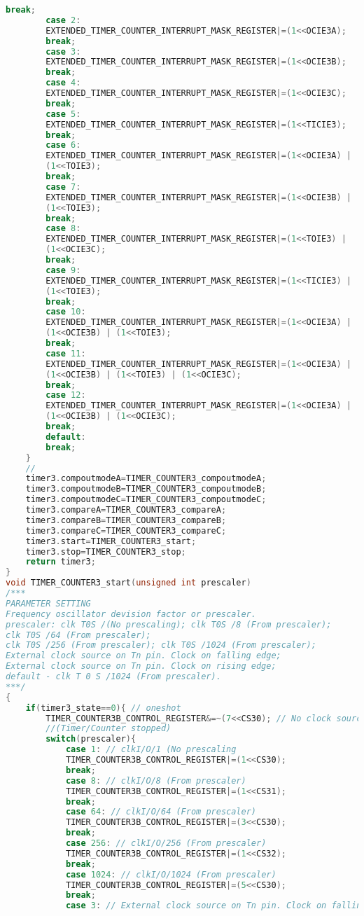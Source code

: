 \begin{lstlisting}[language=C, caption={atmega128timer.c}, label=atmega128timer-c, captionpos=b]
		break;
		case 2:
		EXTENDED_TIMER_COUNTER_INTERRUPT_MASK_REGISTER|=(1<<OCIE3A);
		break;
		case 3:
		EXTENDED_TIMER_COUNTER_INTERRUPT_MASK_REGISTER|=(1<<OCIE3B);
		break;
		case 4:
		EXTENDED_TIMER_COUNTER_INTERRUPT_MASK_REGISTER|=(1<<OCIE3C);
		break;
		case 5:
		EXTENDED_TIMER_COUNTER_INTERRUPT_MASK_REGISTER|=(1<<TICIE3);
		break;
		case 6:
		EXTENDED_TIMER_COUNTER_INTERRUPT_MASK_REGISTER|=(1<<OCIE3A) |
		(1<<TOIE3);
		break;
		case 7:
		EXTENDED_TIMER_COUNTER_INTERRUPT_MASK_REGISTER|=(1<<OCIE3B) |
		(1<<TOIE3);
		break;
		case 8:
		EXTENDED_TIMER_COUNTER_INTERRUPT_MASK_REGISTER|=(1<<TOIE3) |
		(1<<OCIE3C);
		break;
		case 9:
		EXTENDED_TIMER_COUNTER_INTERRUPT_MASK_REGISTER|=(1<<TICIE3) |
		(1<<TOIE3);
		break;
		case 10:
		EXTENDED_TIMER_COUNTER_INTERRUPT_MASK_REGISTER|=(1<<OCIE3A) |
		(1<<OCIE3B) | (1<<TOIE3);
		break;
		case 11:
		EXTENDED_TIMER_COUNTER_INTERRUPT_MASK_REGISTER|=(1<<OCIE3A) |
		(1<<OCIE3B) | (1<<TOIE3) | (1<<OCIE3C);
		break;
		case 12:
		EXTENDED_TIMER_COUNTER_INTERRUPT_MASK_REGISTER|=(1<<OCIE3A) |
		(1<<OCIE3B) | (1<<OCIE3C);
		break;
		default:
		break;
	}
	//
	timer3.compoutmodeA=TIMER_COUNTER3_compoutmodeA;
	timer3.compoutmodeB=TIMER_COUNTER3_compoutmodeB;
	timer3.compoutmodeC=TIMER_COUNTER3_compoutmodeC;
	timer3.compareA=TIMER_COUNTER3_compareA;
	timer3.compareB=TIMER_COUNTER3_compareB;
	timer3.compareC=TIMER_COUNTER3_compareC;
	timer3.start=TIMER_COUNTER3_start;
	timer3.stop=TIMER_COUNTER3_stop;
	return timer3;
}
void TIMER_COUNTER3_start(unsigned int prescaler)
/***
PARAMETER SETTING
Frequency oscillator devision factor or prescaler.
prescaler: clk T0S /(No prescaling); clk T0S /8 (From prescaler);
clk T0S /64 (From prescaler);
clk T0S /256 (From prescaler); clk T0S /1024 (From prescaler);
External clock source on Tn pin. Clock on falling edge;
External clock source on Tn pin. Clock on rising edge;
default - clk T 0 S /1024 (From prescaler).
***/
{
	if(timer3_state==0){ // oneshot
		TIMER_COUNTER3B_CONTROL_REGISTER&=~(7<<CS30); // No clock source.
		//(Timer/Counter stopped)
		switch(prescaler){
			case 1: // clkI/O/1 (No prescaling
			TIMER_COUNTER3B_CONTROL_REGISTER|=(1<<CS30);
			break;
			case 8: // clkI/O/8 (From prescaler)
			TIMER_COUNTER3B_CONTROL_REGISTER|=(1<<CS31);
			break;
			case 64: // clkI/O/64 (From prescaler)
			TIMER_COUNTER3B_CONTROL_REGISTER|=(3<<CS30);
			break;
			case 256: // clkI/O/256 (From prescaler)
			TIMER_COUNTER3B_CONTROL_REGISTER|=(1<<CS32);
			break;
			case 1024: // clkI/O/1024 (From prescaler)
			TIMER_COUNTER3B_CONTROL_REGISTER|=(5<<CS30);
			break;
			case 3: // External clock source on Tn pin. Clock on falling edge

\end{lstlisting}
